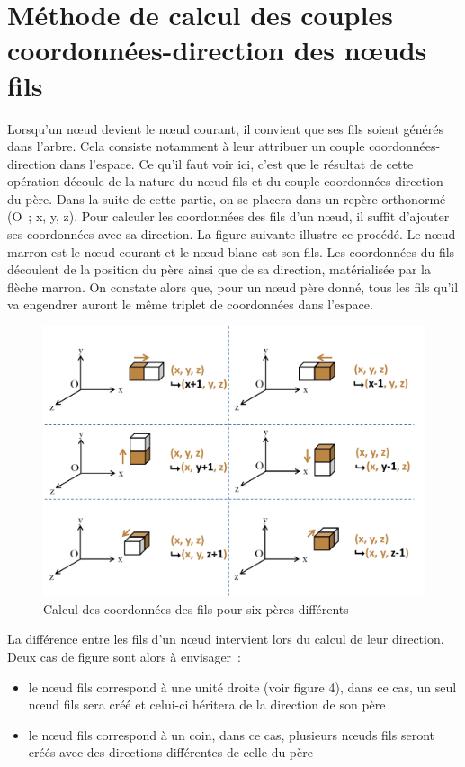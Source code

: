 \section{Méthode de calcul des couples coordonnées-direction des nœuds fils}
Lorsqu’un nœud devient le nœud courant, il convient que ses fils soient générés dans l’arbre. Cela consiste notamment à leur attribuer un couple coordonnées-direction dans l’espace. Ce qu’il faut voir ici, c’est que le résultat de cette opération découle de la nature du nœud fils et du couple coordonnées-direction du père. Dans la suite de cette partie, on se placera dans un repère orthonormé (O ; x, y, z). 
Pour calculer les coordonnées des fils d’un nœud, il suffit d’ajouter ses coordonnées avec sa direction. La figure suivante illustre ce procédé. Le nœud marron est le nœud courant et le nœud blanc est son fils. Les coordonnées du fils découlent de la position du père ainsi que de sa direction, matérialisée par la flèche marron. On constate alors que, pour un nœud père donné, tous les fils qu’il va engendrer auront le même triplet de coordonnées dans l’espace. 

\begin{figure}[h]
 \centering
 \includegraphics[scale=0.5,keepaspectratio=true]{img/buildChildren.png}
 \caption{Calcul des coordonnées des fils pour six pères différents}
 \label{buildChildren}
\end{figure}

La différence entre les fils d’un nœud intervient lors du calcul de leur direction. Deux cas de figure sont alors à envisager :
\begin{itemize}
 \item le nœud fils correspond à une unité droite (voir figure 4), dans ce cas, un seul nœud fils sera créé et celui-ci héritera de la direction de son père
 \item le nœud fils correspond à un coin, dans ce cas, plusieurs nœuds fils seront créés avec des directions différentes de celle du père
\end{itemize}
 

